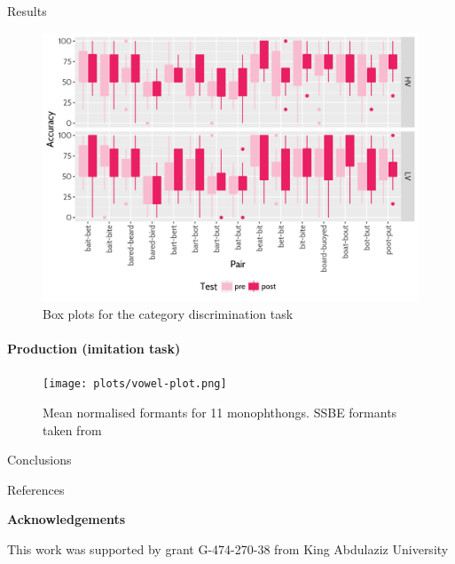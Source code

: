 \documentclass[final,xcolor={cmyk,hyperref}]{beamer}
\begin{document}
\begin{frame}[t]
\begin{columns}[t]
\begin{column}{0.5\linewidth}
\begin{block}{Results}
\vspace*{0.25in}
\begin{figure}
\includegraphics[width=\linewidth]{plots/axb-boxplot.png}
\caption{%
Box plots for the category discrimination task}
\end{figure}
\paragraph{Production (imitation task)}

\begin{figure}[h]
\texttt{[image: plots/vowel-plot.png]}
\caption{Mean normalised formants for 11 monophthongs. SSBE formants
taken from \cite{ferragne_pellegrino_2010}}
\end{figure}
\end{block}

\begin{block}{Conclusions}

\end{block}

\begin{block}{References}
  \renewcommand\bibfont{\tiny}
  \printbibliography
\end{block}

\textbf{Acknowledgements}

  This work was supported by
  grant G-474-270-38 from King Abdulaziz University

\end{column}

\end{columns}

\end{frame}
\end{document}
